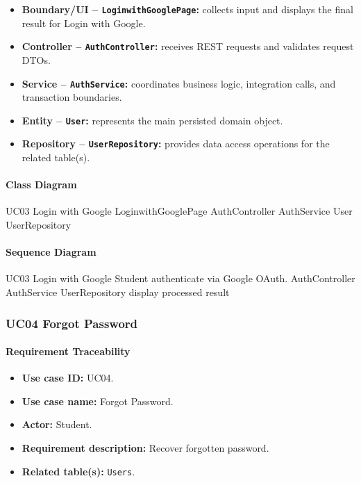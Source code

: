 \begin{itemize}
    \item \textbf{Boundary/UI -- \texttt{LoginwithGooglePage}:} collects input and displays the final result for Login with Google.
    \item \textbf{Controller -- \texttt{AuthController}:} receives REST requests and validates request DTOs.
    \item \textbf{Service -- \texttt{AuthService}:} coordinates business logic, integration calls, and transaction boundaries.
    \item \textbf{Entity -- \texttt{User}:} represents the main persisted domain object.
    \item \textbf{Repository -- \texttt{UserRepository}:} provides data access operations for the related table(s).
\end{itemize}

\paragraph{Class Diagram}

\ClassDiagram
{UC03 Login with Google}
{LoginwithGooglePage}
{AuthController}
{AuthService}
{User}
{UserRepository}

\paragraph{Sequence Diagram}

\SequenceDiagram
{UC03 Login with Google}
{Student}
{authenticate via Google OAuth.}
{AuthController}
{AuthService}
{UserRepository}
{display processed result}

\subsubsection{UC04 Forgot Password}

\paragraph{Requirement Traceability}

\begin{itemize}
    \item \textbf{Use case ID:} UC04.
    \item \textbf{Use case name:} Forgot Password.
    \item \textbf{Actor:} Student.
    \item \textbf{Requirement description:} Recover forgotten password.
    \item \textbf{Related table(s):} \texttt{Users}.
\end{itemize}

